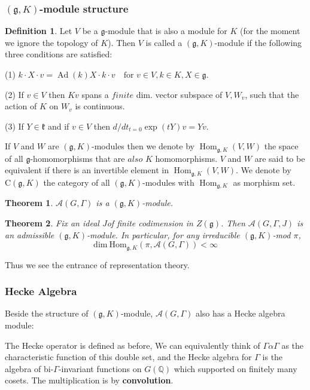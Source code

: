 \documentclass[11pt,english]{smfart}
\newtheorem{theorem}{Theorem}
\theoremstyle{definition}
\newtheorem{definition}{Definition}
\theoremstyle{remark}
\begin{document}
\subsubsection{ $ (\mathfrak{g}, K) $-module structure}
\begin{definition}
Let $ V $ be a $ \mathfrak{g} $-module that is also a module for $ K $ (for the moment we ignore the topology of $ K $). Then $ V $ is called a $ (\mathfrak{g}, K) $-module if the following three conditions are satisfied:

(1) $ k \cdot X \cdot v=\operatorname{Ad}(k) X \cdot k \cdot v \quad \text{for } v \in V, k \in K, X \in \mathfrak{g} $.

(2) If $  v \in V $ then $ K v $ spans a $finite$ dim. vector subspace of $ V, W_{v} $, such that the action of $ K $ on $ W_{v} $ is continuous.

(3) If $ Y \in \mathfrak{k} $ and if $ v \in V $ then $ d / d t_{t=0} \exp (t Y) v=Y v $.

If $ V $ and $ W $ are $ (\mathfrak{g}, K) $-modules then we denote by $ \operatorname{Hom}_{\mathfrak{g}, K}(V, W) $ the space of all $ \mathfrak{g} $-homomorphisms that are $also$ $ K $ homomorphisms.
$ V $ and $ W $ are said to be equivalent if there is an invertible element in $ \operatorname{Hom}_{\mathfrak{g}, K}(V, W) $.
We denote by $ \mathrm{C}(\mathfrak{g}, K) $ the category of all $ (\mathfrak{g}, K) $-modules with $\operatorname{Hom}_{\mathfrak{g}, K}$ as morphism set.
\end{definition}
\begin{theorem}
$\mathcal{A}(G,\Gamma)$ is a $ (\mathfrak{g}, K) $-module.
\end{theorem}
\begin{theorem}
Fix an ideal $J$of finite codimension in $Z(\mathfrak{g})$. Then $\mathcal{A}(G,\Gamma,J)$ is an admissible $ (\mathfrak{g}, K) $-module. In particular, for any irreducible $(\mathfrak{g},K)$-mod $\pi$, 
\[\mathrm{dim} \mathrm{\ Hom}_{\mathfrak{g}, K}(\pi, \mathcal{A}(G,\Gamma)) < \infty\]
\end{theorem}
Thus we see the entrance of representation theory.
\subsubsection{Hecke Algebra}
Beside the structure of $ (\mathfrak{g}, K) $-module, $\mathcal{A}(G,\Gamma)$ also has a Hecke algebra module:

The Hecke operator is defined as before, We can equivalently think of $\Gamma \alpha \Gamma$ as the characteristic function of this double set,
and the Hecke algebra for $\Gamma$ is the algebra of bi-$\Gamma$-invariant functions on $G(\mathbb{Q})$ which supported on finitely many cosets.
The multiplication is by \textbf{convolution}.
\end{document}
